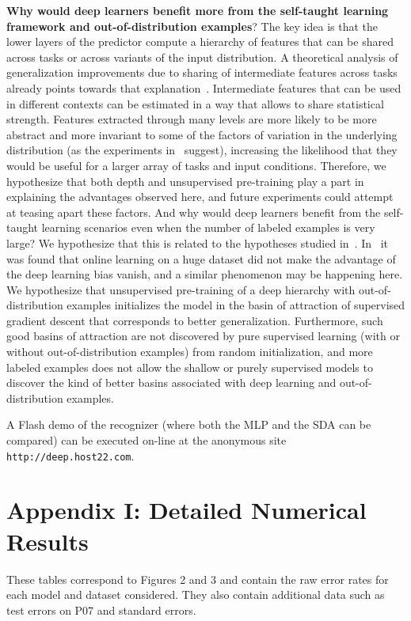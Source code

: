 \documentclass{article} %
\begin{document}
{\bf Why would deep learners benefit more from the self-taught learning 
framework and out-of-distribution examples}?
The key idea is that the lower layers of the predictor compute a hierarchy
of features that can be shared across tasks or across variants of the
input distribution. A theoretical analysis of generalization improvements
due to sharing of intermediate features across tasks already points
towards that explanation~\cite{baxter95a}.
Intermediate features that can be used in different
contexts can be estimated in a way that allows to share statistical 
strength. Features extracted through many levels are more likely to
be more abstract and more invariant to some of the factors of variation
in the underlying distribution (as the experiments in~\citet{Goodfellow2009} suggest),
increasing the likelihood that they would be useful for a larger array
of tasks and input conditions.
Therefore, we hypothesize that both depth and unsupervised
pre-training play a part in explaining the advantages observed here, and future
experiments could attempt at teasing apart these factors.
And why would deep learners benefit from the self-taught learning
scenarios even when the number of labeled examples is very large?
We hypothesize that this is related to the hypotheses studied
in~\citet{Erhan+al-2010}. In~\citet{Erhan+al-2010}
it was found that online learning on a huge dataset did not make the
advantage of the deep learning bias vanish, and a similar phenomenon
may be happening here. We hypothesize that unsupervised pre-training
of a deep hierarchy with out-of-distribution examples initializes the
model in the basin of attraction of supervised gradient descent
that corresponds to better generalization. Furthermore, such good
basins of attraction are not discovered by pure supervised learning
(with or without out-of-distribution examples) from random initialization, and more labeled examples
does not allow the shallow or purely supervised models to discover
the kind of better basins associated
with deep learning and out-of-distribution examples.
 
A Flash demo of the recognizer (where both the MLP and the SDA can be compared) 
can be executed on-line at the anonymous site {\tt http://deep.host22.com}.

\iffalse
\section*{Appendix I: Detailed Numerical Results}

These tables correspond to Figures 2 and 3 and contain the raw error rates for each model and dataset considered.
They also contain additional data such as test errors on P07 and standard errors.
\end{document}
